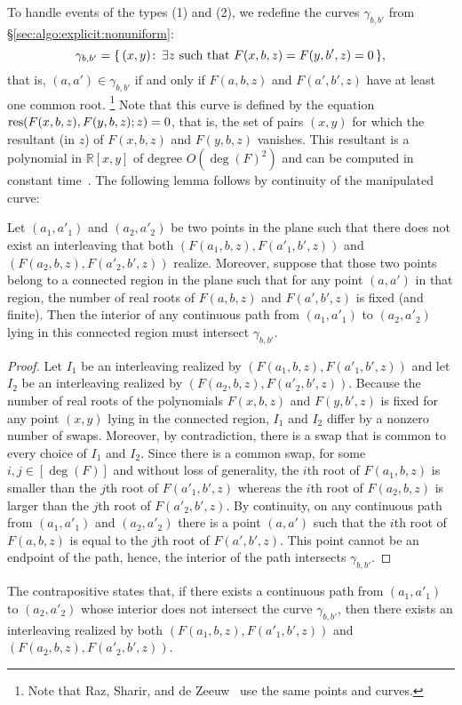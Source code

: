 To handle events of the types (1) and (2), we redefine the curves
$\gamma_{b,b'}$ from \S\ref{sec:algo:explicit:nonuniform}:
\begin{displaymath}
	\gamma_{b,b'} = \{\, (x,y) \st \exists z\ \text{such that}\
	F(x,b,z)=F(y,b',z)=0 \,\},
\end{displaymath}
that is, $(a,a') \in \gamma_{b,b'}$ if and only if $F(a,b,z)$ and $F(a',b',z)$
have at least one common root.%
\footnote{Note that Raz, Sharir, and de Zeeuw~\cite{RSZ15} use the same points
and curves.}
Note that this curve is defined
by the equation
$\operatorname{res}(F(x,b,z),F(y,b,z);z) = 0$,
that is, the set of pairs $(x,y)$ for which the resultant (in $z$) of
$F(x,b,z)$ and $F(y,b,z)$ vanishes. This resultant is a polynomial in
$\mathbb{R}[x,y]$ of degree $O(\deg(F)^2)$ and can be computed in constant time~\cite{CLO07}.
The following lemma follows by continuity of the manipulated curve:
\begin{lemma}\label{lem:cont}
    Let $(a_1,a'_1)$ and $(a_2,a'_2)$ be two points in the plane such
    that there does not exist an interleaving that both
    $(F(a_1,b,z),F(a'_1,b',z))$ and
    $(F(a_2,b,z),F(a'_2,b',z))$ realize. Moreover, suppose that those two
    points belong to a connected region in the plane such that for any point
    $(a,a')$ in that region, the number of real roots of $F(a,b,z)$ and
    $F(a',b',z)$ is fixed (and finite).
    Then the interior of any continuous path from $(a_1,a'_1)$ to $(a_2,a'_2)$ lying in this
    connected region must intersect $\gamma_{b,b'}$.
\end{lemma}
\begin{proof}
    Let $I_1$ be an interleaving realized by
    $(F(a_1,b,z),F(a'_1,b',z))$ and let $I_2$ be an interleaving realized
    by $(F(a_2,b,z),F(a'_2,b',z))$.
    Because the number of real roots of the polynomials $F(x,b,z)$ and
    $F(y,b',z)$ is fixed for any point $(x,y)$ lying in the connected region,
    $I_1$ and $I_2$ differ by a nonzero number of swaps.
    Moreover, by contradiction,
    there is a swap that is common to every choice of $I_1$
    and $I_2$.
    Since there is a common swap,
    for some $i,j \in [\deg(F)]$ and without loss of generality,
    the $i$th root of
    $F(a_1,b,z)$ is smaller than the $j$th root of $F(a'_1,b',z)$ whereas the
    $i$th root of $F(a_2,b,z)$ is larger than the $j$th root of
    $F(a'_2,b',z)$. By continuity, on any continuous path from
    $(a_1,a'_1)$ and $(a_2,a'_2)$ there is a point $(a,a')$ such that the
    $i$th root of $F(a,b,z)$ is equal to the $j$th root of $F(a',b',z)$.
    This point cannot be an endpoint of the path, hence,
    the interior of the path intersects $\gamma_{b,b'}$.
\end{proof}
The contrapositive states that, if there exists a continuous path from
$(a_1,a'_1)$ to $(a_2,a'_2)$ whose interior does not intersect the curve
$\gamma_{b,b'}$, then there exists an interleaving realized by both
$(F(a_1,b,z),F(a'_1,b',z))$ and $(F(a_2,b,z),F(a'_2,b',z))$.

